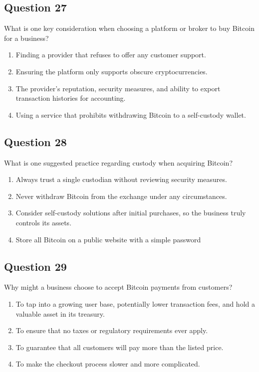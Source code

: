 \documentclass[12pt,a4paper]{article}
\begin{document}
\bigskip


\subsection*{Question 27}
What is one key consideration when choosing a platform or broker to buy Bitcoin for a business?

\begin{enumerate}[label=\Alph*., leftmargin=*]
\item Finding a provider that refuses to offer any customer support.
\item Ensuring the platform only supports obscure cryptocurrencies.
\item The provider’s reputation, security measures, and ability to export transaction histories for accounting.
\item Using a service that prohibits withdrawing Bitcoin to a self-custody wallet.
\end{enumerate}

\bigskip


\subsection*{Question 28}
What is one suggested practice regarding custody when acquiring Bitcoin?

\begin{enumerate}[label=\Alph*., leftmargin=*]
\item Always trust a single custodian without reviewing security measures.
\item Never withdraw Bitcoin from the exchange under any circumstances.
\item Consider self-custody solutions after initial purchases, so the business truly controls its assets.
\item Store all Bitcoin on a public website with a simple password
\end{enumerate}

\bigskip


\subsection*{Question 29}
Why might a business choose to accept Bitcoin payments from customers?

\begin{enumerate}[label=\Alph*., leftmargin=*]
\item To tap into a growing user base, potentially lower transaction fees, and hold a valuable asset in its treasury.
\item To ensure that no taxes or regulatory requirements ever apply.
\item To guarantee that all customers will pay more than the listed price.
\item To make the checkout process slower and more complicated.
\end{enumerate}
\end{document}
